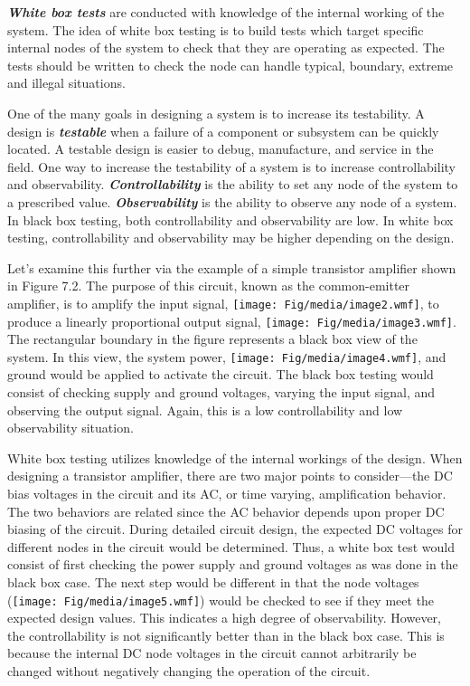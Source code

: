 \emph{\textbf{White box tests}} are conducted with knowledge of the
internal working of the system. The idea of white box testing is to
build tests which target specific internal nodes of the system to check
that they are operating as expected. The tests should be written to
check the node can handle typical, boundary, extreme and illegal
situations.

One of the many goals in designing a system is to increase its
testability. A design is \emph{\textbf{testable}} when a failure of a
component or subsystem can be quickly located. A testable design is
easier to debug, manufacture, and service in the field. One way to
increase the testability of a system is to increase controllability and
observability. \emph{\textbf{Controllability}} is the ability to set any
node of the system to a prescribed value. \textbf{\emph{Observability}}
is the ability to observe any node of a system. In black box testing,
both controllability and observability are low. In white box testing,
controllability and observability may be higher depending on the design.

Let's examine this further via the example of a simple transistor
amplifier shown in Figure 7.2. The purpose of this circuit, known as the
common-emitter amplifier, is to amplify the input signal,
\texttt{[image: Fig/media/image2.wmf]}, to produce a linearly
proportional output signal, \texttt{[image: Fig/media/image3.wmf]}. The
rectangular boundary in the figure represents a black box view of the
system. In this view, the system power,
\texttt{[image: Fig/media/image4.wmf]}, and ground would be applied to
activate the circuit. The black box testing would consist of checking
supply and ground voltages, varying the input signal, and observing the
output signal. Again, this is a low controllability and low
observability situation.

White box testing utilizes knowledge of the internal workings of the
design. When designing a transistor amplifier, there are two major
points to consider---the DC bias voltages in the circuit and its AC, or
time varying, amplification behavior. The two behaviors are related
since the AC behavior depends upon proper DC biasing of the circuit.
During detailed circuit design, the expected DC voltages for different
nodes in the circuit would be determined. Thus, a white box test would
consist of first checking the power supply and ground voltages as was
done in the black box case. The next step would be different in that the
node voltages (\texttt{[image: Fig/media/image5.wmf]}) would be checked
to see if they meet the expected design values. This indicates a high
degree of observability. However, the controllability is not
significantly better than in the black box case. This is because the
internal DC node voltages in the circuit cannot arbitrarily be changed
without negatively changing the operation of the circuit.

